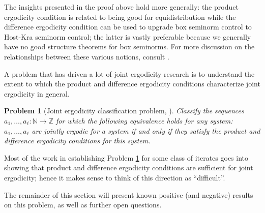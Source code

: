 \documentclass[11pt]{amsart}
\newtheorem{problem}{Problem}
\theoremstyle{definition}
\newcommand{\N}{{\mathbb N}}
\newcommand{\Z}{{\mathbb Z}}
\newcommand{\CX}{{\mathcal X}}
\newcommand{\1}{{\mathbf{1}}}
\begin{document}
    The insights presented in the proof above hold more generally: the product ergodicity condition is related to being good for equidistribution while the difference ergodicity condition can be used to upgrade box seminorm control to Host-Kra seminorm control; the latter is vastly preferable because we generally have no good structure theorems for box seminorms. For more discussion on the relationships between these various notions, consult \cite[Section 12]{DKKST24}.

    A problem that has driven a lot of joint ergodicity research is to understand the extent to which the product and difference ergodicity conditions characterize joint ergodicity in general.
        \begin{problem}[Joint ergodicity classification problem, {\cite[Problem 1]{DKS22}}]\label{Pr: joint ergodicity problem}
    Classify the sequences $a_1, \ldots, a_\ell:\N\to\Z$ for which the following equivalence holds for any system: $a_1, \ldots, a_\ell$ are jointly ergodic for a system if and only if they satisfy the product and difference ergodicity conditions for this system.
    \end{problem}


    Most of the work in establishing Problem \ref{Pr: joint ergodicity problem} for some class of iterates goes into showing that product and difference ergodicity conditions are sufficient for joint ergodicity; hence it makes sense to think of this direction as ``difficult''.

    The remainder of this section will present known positive (and negative) results on this problem, as well as further open questions.
\end{document}
